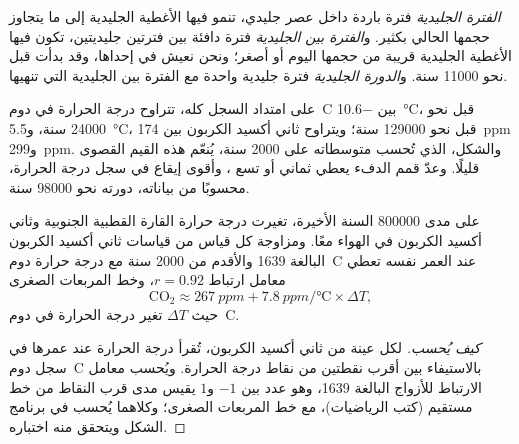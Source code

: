 \begin{definition}\label{def:g12:past-climates:glacial-cycle}
\emph{الفترة الجليدية} فترة باردة داخل
عصر جليدي، تنمو فيها الأغطية الجليدية إلى ما يتجاوز حجمها الحالي بكثير.
و\emph{الفترة بين الجليدية} فترة دافئة بين فترتين
جليديتين، تكون فيها الأغطية الجليدية قريبة من حجمها اليوم أو أصغر؛ ونحن نعيش في إحداها،
وقد بدأت قبل نحو \num{11000} سنة. و\emph{الدورة
الجليدية} فترة جليدية واحدة مع الفترة بين الجليدية التي
تنهيها.
\end{definition}

على امتداد السجل كله، تتراوح درجة الحرارة في دوم~C بين
\qty{-10.6}{\degreeCelsius}، قبل نحو \num{24000} سنة،
و\qty{+5.5}{\degreeCelsius}، قبل نحو \num{129000} سنة؛ ويتراوح ثاني أكسيد الكربون
بين \qty{174}{ppm} و\qty{299}{ppm}. والشكل، الذي تُحسب متوسطاته على \num{2000}
سنة، يُنعّم هذه القيم القصوى قليلًا. وعدّ قمم الدفء يعطي ثماني
أو تسع ، وأقوى إيقاع في سجل درجة الحرارة،
محسوبًا من بياناته، دورته نحو \num{98000} سنة.

\begin{proposition}\label{prop:g12:past-climates:correlation}
على مدى \num{800000} السنة الأخيرة، تغيرت درجة حرارة القارة القطبية الجنوبية وثاني أكسيد
الكربون في الهواء معًا. ومزاوجة كل قياس من قياسات ثاني أكسيد الكربون البالغة 1639
والأقدم من \num{2000} سنة مع درجة حرارة دوم~C عند
العمر نفسه تعطي معامل ارتباط $r = 0.92$،
وخط المربعات الصغرى
\[
  \mathrm{CO_2} \approx \qty{267}{ppm} + \qty{7.8}{ppm/\degreeCelsius} \times \Delta T ,
\]
حيث $\Delta T$ تغير درجة الحرارة في دوم~C.
\end{proposition}

\begin{proof}[كيف يُحسب]
لكل عينة من ثاني أكسيد الكربون، تُقرأ درجة الحرارة عند عمرها في
سجل دوم~C بالاستيفاء بين أقرب نقطتين من نقاط درجة الحرارة.
ويُحسب معامل الارتباط للأزواج البالغة 1639، وهو عدد بين $-1$ و$1$
يقيس مدى قرب النقاط من خط مستقيم (كتب
الرياضيات)، مع خط المربعات الصغرى؛ وكلاهما يُحسب في
برنامج الشكل ويتحقق منه اختباره.
\end{proof}

